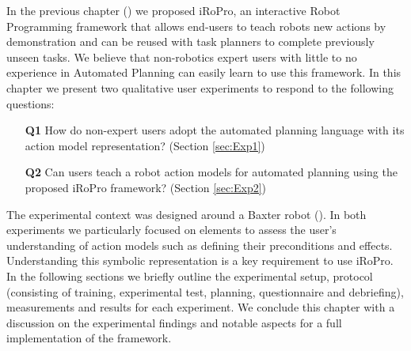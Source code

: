 
In the previous chapter () we proposed iRoPro, an interactive Robot Programming framework that allows end-users to teach robots new actions by demonstration and can be reused with task planners to complete previously unseen tasks.
We believe that non-robotics expert users with little to no experience in Automated Planning can easily learn to use this framework.
In this chapter we present two qualitative user experiments to respond to the following questions:
\begin{enumerate}
  \item[\textbf{Q1}] How do non-expert users adopt the automated planning language with its action model representation? (Section \ref{sec:Exp1})
  \item[\textbf{Q2}] Can users teach a robot action models for automated planning using the proposed iRoPro framework? (Section \ref{sec:Exp2})
\end{enumerate}

The experimental context was designed around a Baxter robot ().
In both experiments we particularly focused on elements to assess the user's understanding of action models such as defining their preconditions and effects.
Understanding this symbolic representation is a key requirement to use iRoPro.
In the following sections we briefly outline the experimental setup, protocol (consisting of training, experimental test, planning, questionnaire and debriefing), measurements and results for each experiment.
We conclude this chapter with a discussion on the experimental findings and notable aspects for a full implementation of the framework.
 
